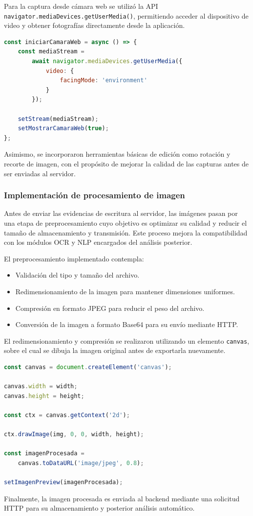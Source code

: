Para la captura desde cámara web se utilizó la API \texttt{navigator.mediaDevices.getUserMedia()}, permitiendo acceder al dispositivo de video y obtener fotografías directamente desde la aplicación.

\begin{lstlisting}[language=JavaScript, caption={Inicialización de la cámara web}]
const iniciarCamaraWeb = async () => {
    const mediaStream =
        await navigator.mediaDevices.getUserMedia({
            video: {
                facingMode: 'environment'
            }
        });

    setStream(mediaStream);
    setMostrarCamaraWeb(true);
};
\end{lstlisting}

Asimismo, se incorporaron herramientas básicas de edición como rotación y recorte de imagen, con el propósito de mejorar la calidad de las capturas antes de ser enviadas al servidor.

\subsubsection{Implementación de procesamiento de imagen}

Antes de enviar las evidencias de escritura al servidor, las imágenes pasan por una etapa de preprocesamiento cuyo objetivo es optimizar su calidad y reducir el tamaño de almacenamiento y transmisión. Este proceso mejora la compatibilidad con los módulos OCR y NLP encargados del análisis posterior.

El preprocesamiento implementado contempla:

\begin{itemize}
    \item Validación del tipo y tamaño del archivo.
    \item Redimensionamiento de la imagen para mantener dimensiones uniformes.
    \item Compresión en formato JPEG para reducir el peso del archivo.
    \item Conversión de la imagen a formato Base64 para su envío mediante HTTP.
\end{itemize}

El redimensionamiento y compresión se realizaron utilizando un elemento \texttt{canvas}, sobre el cual se dibuja la imagen original antes de exportarla nuevamente.

\begin{lstlisting}[language=JavaScript, caption={Preprocesamiento de imagen antes del envío}]
const canvas = document.createElement('canvas');

canvas.width = width;
canvas.height = height;

const ctx = canvas.getContext('2d');

ctx.drawImage(img, 0, 0, width, height);

const imagenProcesada =
    canvas.toDataURL('image/jpeg', 0.8);

setImagenPreview(imagenProcesada);
\end{lstlisting}

Finalmente, la imagen procesada es enviada al backend mediante una solicitud HTTP para su almacenamiento y posterior análisis automático.

